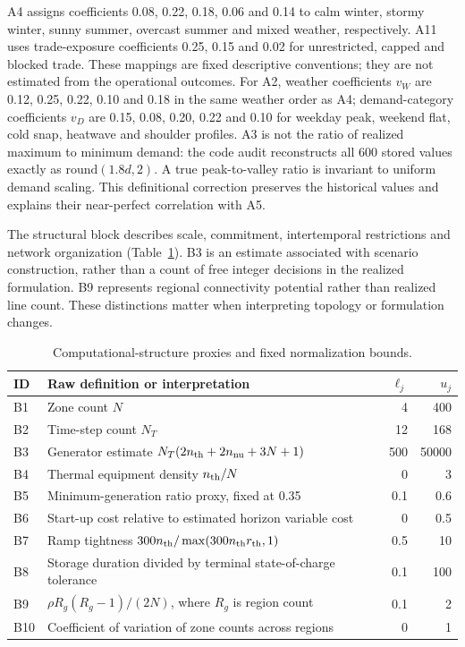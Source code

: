 A4 assigns coefficients 0.08, 0.22, 0.18, 0.06 and 0.14 to calm winter,
stormy winter, sunny summer, overcast summer and mixed weather, respectively.
A11 uses trade-exposure coefficients 0.25, 0.15 and 0.02 for unrestricted,
capped and blocked trade. These mappings are fixed descriptive conventions;
they are not estimated from the operational outcomes.
For A2, weather coefficients $v_W$ are 0.12, 0.25, 0.22, 0.10 and 0.18
in the same weather order as A4; demand-category coefficients $v_D$ are
0.15, 0.08, 0.20, 0.22 and 0.10 for weekday peak, weekend flat, cold snap,
heatwave and shoulder profiles. A3 is not the ratio of realized maximum to
minimum demand: the code audit reconstructs all 600 stored values exactly
as $\mathrm{round}(1.8d,2)$. A true peak-to-valley ratio is invariant to
uniform demand scaling. This definitional correction preserves the historical
values and explains their near-perfect correlation with A5.

The structural block describes scale, commitment, intertemporal restrictions
and network organization (Table~\ref{tab:structural_components}). B3 is an
estimate associated with scenario construction, rather than a count of free
integer decisions in the realized formulation. B9 represents regional
connectivity potential rather than realized line count. These distinctions
matter when interpreting topology or formulation changes.

\begin{table}[htbp]\centering\small
\begin{tabular}{lp{.59\linewidth}rr}\toprule
ID & Raw definition or interpretation & $\ell_j$ & $u_j$\\\midrule
B1 & Zone count $N$ & 4 & 400\\
B2 & Time-step count $N_T$ & 12 & 168\\
B3 & Generator estimate $N_T(2n_{\rm th}+2n_{\rm nu}+3N+1)$ & 500 & 50000\\
B4 & Thermal equipment density $n_{\rm th}/N$ & 0 & 3\\
B5 & Minimum-generation ratio proxy, fixed at 0.35 & 0.1 & 0.6\\
B6 & Start-up cost relative to estimated horizon variable cost & 0 & 0.5\\
B7 & Ramp tightness $300n_{\rm th}/\max(300n_{\rm th}r_{\rm th},1)$ & 0.5 & 10\\
B8 & Storage duration divided by terminal state-of-charge tolerance & 0.1 & 100\\
B9 & $\rho R_g(R_g-1)/(2N)$, where $R_g$ is region count & 0.1 & 2\\
B10 & Coefficient of variation of zone counts across regions & 0 & 1\\\bottomrule
\end{tabular}
\caption{Computational-structure proxies and fixed normalization bounds.}
\label{tab:structural_components}
\end{table}

